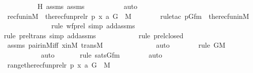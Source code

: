 \begin{isabellebody}
\ \ \ \ \ \ \ \ \isamarkupfalse%
\ H\ assms{}\ assms{}\ \isanewline
\ \ \ \ \ \ \ \ \isamarkupfalse%
\ auto\isanewline
\ \ \ \ \isamarkupfalse%
\isanewline
\isanewline
\ \ \ \ \isamarkupfalse%
\ recfun{}inM\ {\isacharcolon}{\kern0pt}\ {\isachardoublequoteopen}the{\isacharunderscore}{\kern0pt}recfun{\isacharparenleft}{\kern0pt}prel{\isacharparenleft}{\kern0pt}r{\isacharcomma}{\kern0pt}\ p{\isacharparenright}{\kern0pt}{\isacharcomma}{\kern0pt}\ {\isasymlangle}x{\isacharcomma}{\kern0pt}\ a{\isasymrangle}{\isacharcomma}{\kern0pt}\ G{\isacharparenright}{\kern0pt}\ {\isasymin}\ M{\isachardoublequoteclose}\ \isanewline
\ \ \ \ \ \ \isamarkupfalse%
{\isacharparenleft}{\kern0pt}rule{\isacharunderscore}{\kern0pt}tac\ p{\isacharequal}{\kern0pt}Gfm\ \ the{\isacharunderscore}{\kern0pt}recfun{\isacharunderscore}{\kern0pt}in{\isacharunderscore}{\kern0pt}M{\isacharparenright}{\kern0pt}\isanewline
\ \ \ \ \ \ \ \ \ \ \ \ \ \isamarkupfalse%
{\isacharparenleft}{\kern0pt}rule\ wf{\isacharunderscore}{\kern0pt}prel{\isacharcomma}{\kern0pt}\ simp\ add{\isacharcolon}{\kern0pt}assms{\isacharparenright}{\kern0pt}\isanewline
\ \ \ \ \ \ \ \ \ \ \ \ \isamarkupfalse%
{\isacharparenleft}{\kern0pt}rule\ prel{\isacharunderscore}{\kern0pt}trans{\isacharcomma}{\kern0pt}\ simp\ add{\isacharcolon}{\kern0pt}assms{\isacharparenright}{\kern0pt}\isanewline
\ \ \ \ \ \ \ \ \ \ \ \isamarkupfalse%
{\isacharparenleft}{\kern0pt}rule\ prel{\isacharunderscore}{\kern0pt}closed{\isacharparenright}{\kern0pt}\isanewline
\ \ \ \ \ \ \isamarkupfalse%
\ assms\ pair{\isacharunderscore}{\kern0pt}in{\isacharunderscore}{\kern0pt}M{\isacharunderscore}{\kern0pt}iff\ xinM\ transM\ \isanewline
\ \ \ \ \ \ \ \ \ \ \ \ \isamarkupfalse%
\ auto{\isacharbrackleft}{\kern0pt}{}{\isacharbrackright}{\kern0pt}\isanewline
\ \ \ \ \ \ \ \isamarkupfalse%
{\isacharparenleft}{\kern0pt}rule\ GM{\isacharparenright}{\kern0pt}\isanewline
\ \ \ \ \ \ \ \ \ \isamarkupfalse%
\ auto{\isacharbrackleft}{\kern0pt}{}{\isacharbrackright}{\kern0pt}\isanewline
\ \ \ \ \ \ \isamarkupfalse%
{\isacharparenleft}{\kern0pt}rule\ satsGfm{\isacharparenright}{\kern0pt}\isanewline
\ \ \ \ \ \ \isamarkupfalse%
\ auto\isanewline
\isanewline
\ \ \ \ \isamarkupfalse%
\ \isamarkupfalse%
\ {\isachardoublequoteopen}range{\isacharparenleft}{\kern0pt}the{\isacharunderscore}{\kern0pt}recfun{\isacharparenleft}{\kern0pt}prel{\isacharparenleft}{\kern0pt}r{\isacharcomma}{\kern0pt}\ p{\isacharparenright}{\kern0pt}{\isacharcomma}{\kern0pt}\ {\isasymlangle}x{\isacharcomma}{\kern0pt}\ a{\isasymrangle}{\isacharcomma}{\kern0pt}\ G{\isacharparenright}{\kern0pt}{\isacharparenright}{\kern0pt}\ {\isasymin}\ M{\isachardoublequoteclose}\ \isamarkupfalse%

\end{isabellebody}
